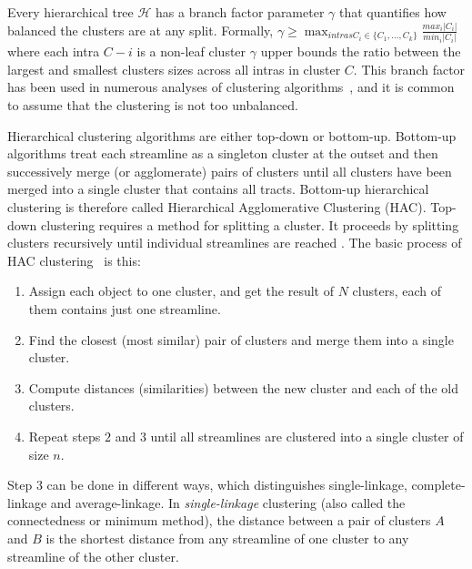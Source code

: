 Every hierarchical tree $\mathcal{H}$ has a branch factor parameter $\gamma$ that quantifies how balanced the clusters are at any split.
Formally, $\gamma \geq \max_{intras C_i \in \{C_1, \ldots,C_k\}} \frac{max_i |C_i|}{min_i |C_i|}$
 where each intra $C-i$ is a non-leaf cluster
 $\gamma$ upper bounds the ratio between the largest and smallest clusters sizes across all intras in cluster $C$. This branch factor has been used in numerous analyses of clustering algorithms~\cite{eriksson2011active,balakrishnan2011noise}, and it is common to assume that the clustering is not too unbalanced.

Hierarchical clustering algorithms are either top-down or bottom-up. Bottom-up algorithms treat each streamline as a singleton cluster at the outset and then successively merge (or agglomerate) pairs of clusters until all clusters have been merged into a single cluster that contains all tracts. Bottom-up hierarchical clustering is therefore called Hierarchical Agglomerative Clustering (HAC). Top-down clustering requires a method for splitting a cluster. It proceeds by splitting clusters recursively until individual streamlines are reached \cite{johnson1967hierarchical}.
The basic process of HAC clustering~\cite{johnson1967hierarchical} is this:
\begin{enumerate}
	\item Assign each object to one cluster, and get the result of $N$ clusters, each of them contains just one streamline.
	\item Find the closest (most similar) pair of clusters and merge them into a single cluster.
	\item Compute distances (similarities) between the new cluster and each of the old clusters.
	\item Repeat steps $2$ and $3$ until all streamlines are clustered into a single cluster of size $n$.
\end{enumerate}
Step $3$ can be done in different ways, which distinguishes single-linkage, complete-linkage and average-linkage.
In \emph{single-linkage} clustering (also called the connectedness or minimum method), the distance between a pair of clusters $A$ and $B$ is the shortest distance from any streamline of one cluster to any streamline of the other cluster. 
